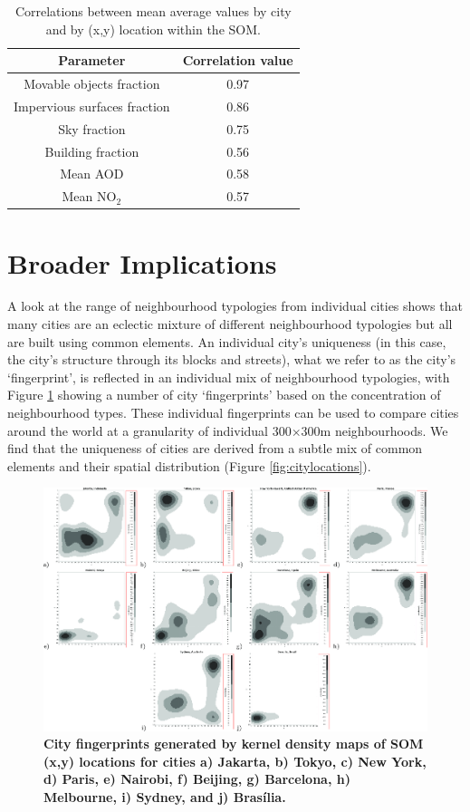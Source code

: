 \begin{table}
\centering
\caption{Correlations between mean average values by city and by (x,y) location within the SOM.}\label{table:correlations}
\begin{tabular}{ | c | c |}
\hline \textbf{Parameter} & \textbf{Correlation value}\\ \hline
Movable objects fraction& 0.97 \\ \hline
Impervious surfaces fraction& 0.86 \\ \hline
Sky fraction& 0.75 \\ \hline
Building fraction& 0.56 \\ \hline
Mean AOD& 0.58 \\ \hline
Mean NO$_{2}$&0.57 \\ \hline
\end{tabular}
\end{table}



\section{Broader Implications}

A look at the range of neighbourhood typologies from individual cities shows that many cities are an eclectic mixture of different neighbourhood typologies but all are built using common elements. An individual city's uniqueness (in this case, the city's structure through its blocks and streets), what we refer to as the city's `fingerprint', is reflected in an individual mix of neighbourhood typologies, with Figure \ref{fig:kernel} showing a number of city `fingerprints' based on the concentration of neighbourhood types. These individual fingerprints can be used to compare cities around the world at a granularity of individual 300$\times$300m neighbourhoods. We find that the uniqueness of cities are derived from a subtle mix of common elements and their spatial distribution (Figure \ref{fig:citylocations}).

\begin{figure}
\centering
\includegraphics[trim={0 0 0 0},clip,scale=0.17]{BlockTypologies_Figures2-1.png}
\caption{\bf City fingerprints generated by kernel density maps of SOM (x,y) locations for cities 
a) Jakarta,
b) Tokyo, 
c) New York, 
d) Paris,
e) Nairobi,
f) Beijing, 
g) Barcelona, 
h) Melbourne, 
i) Sydney, and
j) Bras\'{i}lia.
}
 \label{fig:kernel}
\end{figure} 

